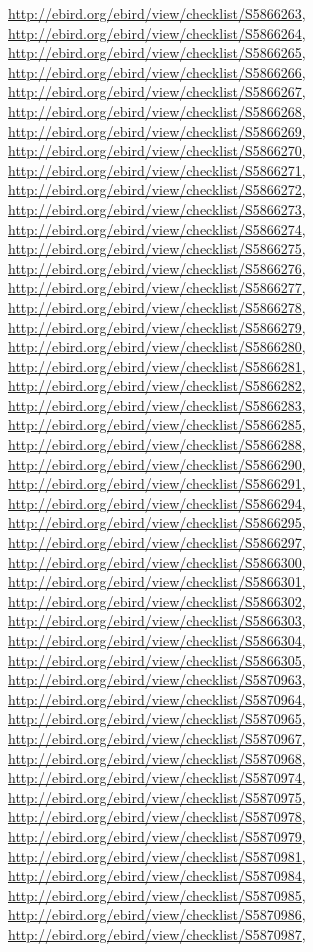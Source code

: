 \documentclass[9pt, article]{memoir}
\begin{document}
\begin{multicols}{2}
\url{http://ebird.org/ebird/view/checklist/S5866263}, 
\url{http://ebird.org/ebird/view/checklist/S5866264}, 
\url{http://ebird.org/ebird/view/checklist/S5866265}, 
\url{http://ebird.org/ebird/view/checklist/S5866266}, 
\url{http://ebird.org/ebird/view/checklist/S5866267}, 
\url{http://ebird.org/ebird/view/checklist/S5866268}, 
\url{http://ebird.org/ebird/view/checklist/S5866269}, 
\url{http://ebird.org/ebird/view/checklist/S5866270}, 
\url{http://ebird.org/ebird/view/checklist/S5866271}, 
\url{http://ebird.org/ebird/view/checklist/S5866272}, 
\url{http://ebird.org/ebird/view/checklist/S5866273}, 
\url{http://ebird.org/ebird/view/checklist/S5866274}, 
\url{http://ebird.org/ebird/view/checklist/S5866275}, 
\url{http://ebird.org/ebird/view/checklist/S5866276}, 
\url{http://ebird.org/ebird/view/checklist/S5866277}, 
\url{http://ebird.org/ebird/view/checklist/S5866278}, 
\url{http://ebird.org/ebird/view/checklist/S5866279}, 
\url{http://ebird.org/ebird/view/checklist/S5866280}, 
\url{http://ebird.org/ebird/view/checklist/S5866281}, 
\url{http://ebird.org/ebird/view/checklist/S5866282}, 
\url{http://ebird.org/ebird/view/checklist/S5866283}, 
\url{http://ebird.org/ebird/view/checklist/S5866285}, 
\url{http://ebird.org/ebird/view/checklist/S5866288}, 
\url{http://ebird.org/ebird/view/checklist/S5866290}, 
\url{http://ebird.org/ebird/view/checklist/S5866291}, 
\url{http://ebird.org/ebird/view/checklist/S5866294}, 
\url{http://ebird.org/ebird/view/checklist/S5866295}, 
\url{http://ebird.org/ebird/view/checklist/S5866297}, 
\url{http://ebird.org/ebird/view/checklist/S5866300}, 
\url{http://ebird.org/ebird/view/checklist/S5866301}, 
\url{http://ebird.org/ebird/view/checklist/S5866302}, 
\url{http://ebird.org/ebird/view/checklist/S5866303}, 
\url{http://ebird.org/ebird/view/checklist/S5866304}, 
\url{http://ebird.org/ebird/view/checklist/S5866305}, 
\url{http://ebird.org/ebird/view/checklist/S5870963}, 
\url{http://ebird.org/ebird/view/checklist/S5870964}, 
\url{http://ebird.org/ebird/view/checklist/S5870965}, 
\url{http://ebird.org/ebird/view/checklist/S5870967}, 
\url{http://ebird.org/ebird/view/checklist/S5870968}, 
\url{http://ebird.org/ebird/view/checklist/S5870974}, 
\url{http://ebird.org/ebird/view/checklist/S5870975}, 
\url{http://ebird.org/ebird/view/checklist/S5870978}, 
\url{http://ebird.org/ebird/view/checklist/S5870979}, 
\url{http://ebird.org/ebird/view/checklist/S5870981}, 
\url{http://ebird.org/ebird/view/checklist/S5870984}, 
\url{http://ebird.org/ebird/view/checklist/S5870985}, 
\url{http://ebird.org/ebird/view/checklist/S5870986}, 
\url{http://ebird.org/ebird/view/checklist/S5870987}, 

\end{multicols}
\end{document}
